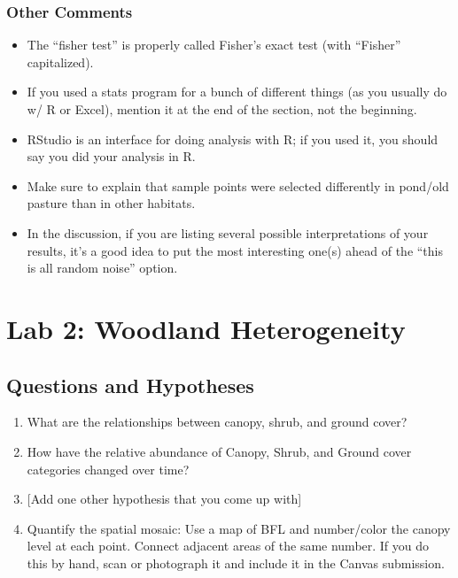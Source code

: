 \documentclass[]{book}
\providecommand{\tightlist}{%
  \setlength{\itemsep}{0pt}\setlength{\parskip}{0pt}}
\begin{document}
\subsection{Other Comments}\label{other-comments}

\begin{itemize}
\tightlist
\item
  The ``fisher test'' is properly called Fisher's exact test (with
  ``Fisher'' capitalized).
\item
  If you used a stats program for a bunch of different things (as you
  usually do w/ R or Excel), mention it at the end of the section, not
  the beginning.
\item
  RStudio is an interface for doing analysis with R; if you used it, you
  should say you did your analysis in R.
\item
  Make sure to explain that sample points were selected differently in
  pond/old pasture than in other habitats.
\item
  In the discussion, if you are listing several possible interpretations
  of your results, it's a good idea to put the most interesting one(s)
  ahead of the ``this is all random noise'' option.
\end{itemize}

\chapter{Lab 2: Woodland Heterogeneity}\label{Lab2}

\section{Questions and Hypotheses}\label{questions-and-hypotheses}

\begin{enumerate}
\def\labelenumi{\arabic{enumi}.}
\tightlist
\item
  What are the relationships between canopy, shrub, and ground cover?
\item
  How have the relative abundance of Canopy, Shrub, and Ground cover
  categories changed over time?
\item
  {[}Add one other hypothesis that you come up with{]}
\item
  Quantify the spatial mosaic: Use a map of BFL and number/color the
  canopy level at each point. Connect adjacent areas of the same number.
  If you do this by hand, scan or photograph it and include it in the
  Canvas submission.
\end{enumerate}
\end{document}
